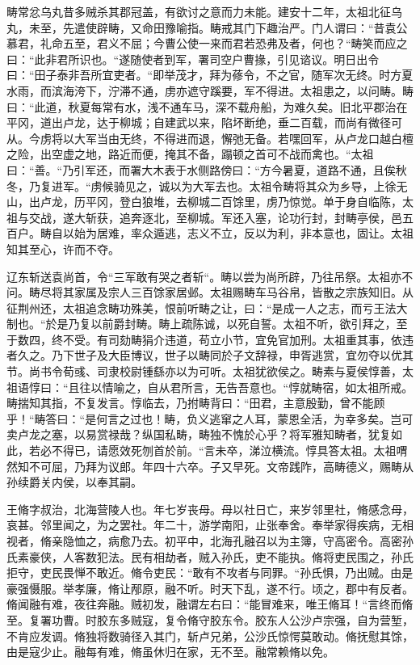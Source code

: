\documentclass[12pt,UTF8]{ctexbook}
\begin{document}
畴常忿乌丸昔多贼杀其郡冠盖，有欲讨之意而力未能。建安十二年，太祖北征乌丸，未至，先遣使辟畴，又命田豫喻指。畴戒其门下趣治严。门人谓曰：“昔袁公慕君，礼命五至，君义不屈；今曹公使一来而君若恐弗及者，何也？“畴笑而应之曰：“此非君所识也。“遂随使者到军，署司空户曹掾，引见谘议。明日出令曰：“田子泰非吾所宜吏者。“即举茂才，拜为蓚令，不之官，随军次无终。时方夏水雨，而滨海洿下，泞滞不通，虏亦遮守蹊要，军不得进。太祖患之，以问畴。畴曰：“此道，秋夏每常有水，浅不通车马，深不载舟船，为难久矣。旧北平郡治在平冈，道出卢龙，达于柳城；自建武以来，陷坏断绝，垂二百载，而尚有微径可从。今虏将以大军当由无终，不得进而退，懈弛无备。若嘿回军，从卢龙口越白檀之险，出空虚之地，路近而便，掩其不备，蹋顿之首可不战而禽也。“太祖曰：“善。“乃引军还，而署大木表于水侧路傍曰：“方今暑夏，道路不通，且俟秋冬，乃复进军。“虏候骑见之，诚以为大军去也。太祖令畴将其众为乡导，上徐无山，出卢龙，历平冈，登白狼堆，去柳城二百馀里，虏乃惊觉。单于身自临陈，太祖与交战，遂大斩获，追奔逐北，至柳城。军还入塞，论功行封，封畴亭侯，邑五百户。畴自以始为居难，率众遁逃，志义不立，反以为利，非本意也，固让。太祖知其至心，许而不夺。

辽东斩送袁尚首，令“三军敢有哭之者斩“。畴以尝为尚所辟，乃往吊祭。太祖亦不问。畴尽将其家属及宗人三百馀家居邺。太祖赐畴车马谷帛，皆散之宗族知旧。从征荆州还，太祖追念畴功殊美，恨前听畴之让，曰：“是成一人之志，而亏王法大制也。“於是乃复以前爵封畴。畴上疏陈诚，以死自誓。太祖不听，欲引拜之，至于数四，终不受。有司劾畴狷介违道，苟立小节，宜免官加刑。太祖重其事，依违者久之。乃下世子及大臣博议，世子以畴同於子文辞禄，申胥逃赏，宜勿夺以优其节。尚书令荀彧、司隶校尉锺繇亦以为可听。太祖犹欲侯之。畴素与夏侯惇善，太祖语惇曰：“且往以情喻之，自从君所言，无告吾意也。“惇就畴宿，如太祖所戒。畴揣知其指，不复发言。惇临去，乃拊畴背曰：“田君，主意殷勤，曾不能顾乎！“畴答曰：“是何言之过也！畴，负义逃窜之人耳，蒙恩全活，为幸多矣。岂可卖卢龙之塞，以易赏禄哉？纵国私畴，畴独不愧於心乎？将军雅知畴者，犹复如此，若必不得已，请愿效死刎首於前。“言未卒，涕泣横流。惇具答太祖。太祖喟然知不可屈，乃拜为议郎。年四十六卒。子又早死。文帝践阼，高畴德义，赐畴从孙续爵关内侯，以奉其嗣。

王脩字叔治，北海营陵人也。年七岁丧母。母以社日亡，来岁邻里社，脩感念母，哀甚。邻里闻之，为之罢社。年二十，游学南阳，止张奉舍。奉举家得疾病，无相视者，脩亲隐恤之，病愈乃去。初平中，北海孔融召以为主簿，守高密令。高密孙氏素豪侠，人客数犯法。民有相劫者，贼入孙氏，吏不能执。脩将吏民围之，孙氏拒守，吏民畏惮不敢近。脩令吏民：“敢有不攻者与同罪。“孙氏惧，乃出贼。由是豪强慑服。举孝廉，脩让邴原，融不听。时天下乱，遂不行。顷之，郡中有反者。脩闻融有难，夜往奔融。贼初发，融谓左右曰：“能冒难来，唯王脩耳！“言终而脩至。复署功曹。时胶东多贼寇，复令脩守胶东令。胶东人公沙卢宗强，自为营堑，不肯应发调。脩独将数骑径入其门，斩卢兄弟，公沙氏惊愕莫敢动。脩抚慰其馀，由是寇少止。融每有难，脩虽休归在家，无不至。融常赖脩以免。
\end{document}
